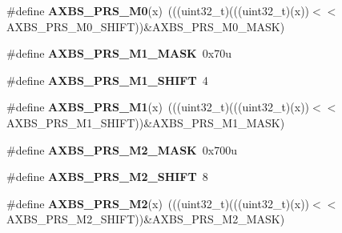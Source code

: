 \begin{DoxyCompactItemize}
\item 
\#define {\bfseries A\+X\+B\+S\+\_\+\+P\+R\+S\+\_\+\+M0}(x)~(((uint32\+\_\+t)(((uint32\+\_\+t)(x))$<$$<$A\+X\+B\+S\+\_\+\+P\+R\+S\+\_\+\+M0\+\_\+\+S\+H\+I\+FT))\&A\+X\+B\+S\+\_\+\+P\+R\+S\+\_\+\+M0\+\_\+\+M\+A\+SK)\hypertarget{group__AXBS__Register__Masks_ga86a3b0cbbb03cc09f4b0b1e367219509}{}\label{group__AXBS__Register__Masks_ga86a3b0cbbb03cc09f4b0b1e367219509}

\item 
\#define {\bfseries A\+X\+B\+S\+\_\+\+P\+R\+S\+\_\+\+M1\+\_\+\+M\+A\+SK}~0x70u\hypertarget{group__AXBS__Register__Masks_ga69131fbb37b2a3eef0e0f135e265e1c0}{}\label{group__AXBS__Register__Masks_ga69131fbb37b2a3eef0e0f135e265e1c0}

\item 
\#define {\bfseries A\+X\+B\+S\+\_\+\+P\+R\+S\+\_\+\+M1\+\_\+\+S\+H\+I\+FT}~4\hypertarget{group__AXBS__Register__Masks_gab293a628aa64a93c04ba49fd27326592}{}\label{group__AXBS__Register__Masks_gab293a628aa64a93c04ba49fd27326592}

\item 
\#define {\bfseries A\+X\+B\+S\+\_\+\+P\+R\+S\+\_\+\+M1}(x)~(((uint32\+\_\+t)(((uint32\+\_\+t)(x))$<$$<$A\+X\+B\+S\+\_\+\+P\+R\+S\+\_\+\+M1\+\_\+\+S\+H\+I\+FT))\&A\+X\+B\+S\+\_\+\+P\+R\+S\+\_\+\+M1\+\_\+\+M\+A\+SK)\hypertarget{group__AXBS__Register__Masks_gac31344f54ce2464ad6f8fef404561b80}{}\label{group__AXBS__Register__Masks_gac31344f54ce2464ad6f8fef404561b80}

\item 
\#define {\bfseries A\+X\+B\+S\+\_\+\+P\+R\+S\+\_\+\+M2\+\_\+\+M\+A\+SK}~0x700u\hypertarget{group__AXBS__Register__Masks_gacd2feac8facc9d0b21f438eef172fd81}{}\label{group__AXBS__Register__Masks_gacd2feac8facc9d0b21f438eef172fd81}

\item 
\#define {\bfseries A\+X\+B\+S\+\_\+\+P\+R\+S\+\_\+\+M2\+\_\+\+S\+H\+I\+FT}~8\hypertarget{group__AXBS__Register__Masks_gacf78955a5852e31c71c1542d873df6b3}{}\label{group__AXBS__Register__Masks_gacf78955a5852e31c71c1542d873df6b3}

\item 
\#define {\bfseries A\+X\+B\+S\+\_\+\+P\+R\+S\+\_\+\+M2}(x)~(((uint32\+\_\+t)(((uint32\+\_\+t)(x))$<$$<$A\+X\+B\+S\+\_\+\+P\+R\+S\+\_\+\+M2\+\_\+\+S\+H\+I\+FT))\&A\+X\+B\+S\+\_\+\+P\+R\+S\+\_\+\+M2\+\_\+\+M\+A\+SK)\hypertarget{group__AXBS__Register__Masks_gadd7d2a1cebd1400511024fb5bbae6738}{}\label{group__AXBS__Register__Masks_gadd7d2a1cebd1400511024fb5bbae6738}


\end{DoxyCompactItemize}
